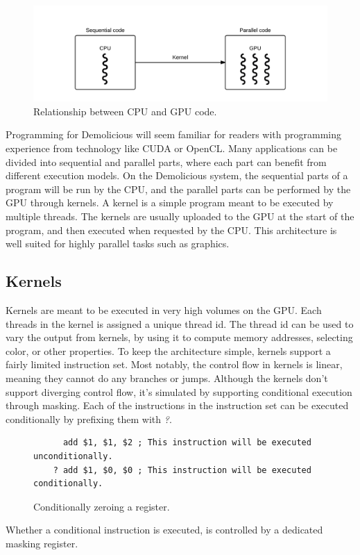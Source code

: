 \begin{figure}[H]
	\centering
	\includegraphics[width=\textwidth]{system_overview/diagrams/programming_model_cpu_gpu.png}
	\caption{Relationship between CPU and GPU code.}
	\label{fig:programming_model_cpu_gpu}
\end{figure}
Programming for Demolicious will seem familiar for readers with programming experience from technology like CUDA or OpenCL. 
Many applications can be divided into sequential and parallel parts, where each part can benefit from different execution models. 
On the Demolicious system, the sequential parts of a program will be run by the CPU, and the parallel parts can be performed by the GPU through kernels.
A kernel is a simple program meant to be executed by multiple threads.
The kernels are usually uploaded to the GPU at the start of the program, and then executed when requested by the CPU.
This architecture is well suited for highly parallel tasks such as graphics.

\subsection{Kernels}
Kernels are meant to be executed in very high volumes on the GPU.
Each threads in the kernel is assigned a unique thread id.
The thread id can be used to vary the output from kernels, 
by using it to compute memory addresses, selecting color, or other properties.
To keep the architecture simple, kernels support a fairly limited instruction set.
Most notably, the control flow in kernels is linear, meaning they cannot do any branches or jumps.
Although the kernels don't support diverging control flow,
it's simulated by supporting conditional execution through masking.
Each of the instructions in the instruction set can be executed conditionally by prefixing them with \textit{?}.
\begin{figure}[H]
	\centering
	\begin{verbatim}
	  add $1, $1, $2 ; This instruction will be executed unconditionally.
	? add $1, $0, $0 ; This instruction will be executed conditionally.
	\end{verbatim}
	\caption{Conditionally zeroing a register.}
	\label{fig:conditional_execution}
\end{figure}
Whether a conditional instruction is executed, is controlled by a dedicated masking register. 

